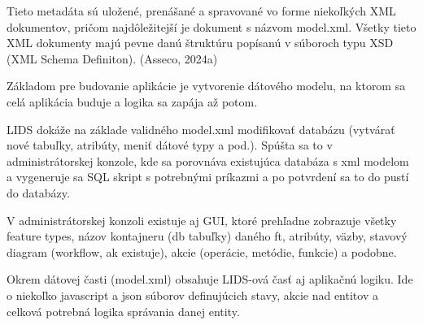 Tieto metadáta sú uložené, prenášané a spravované vo forme niekoľkých XML dokumentov, pričom najdôležitejší je dokument s názvom model.xml. Všetky tieto XML dokumenty majú pevne danú štruktúru popísanú v súboroch typu XSD (XML Schema Definiton). \scr(Asseco, 2024a)

%

Základom pre budovanie aplikácie je vytvorenie dátového modelu, na ktorom sa celá aplikácia buduje a logika sa zapája až potom. 

LIDS dokáže na základe validného model.xml modifikovať databázu (vytvárať nové tabuľky, atribúty, meniť dátové typy a pod.). Spúšta sa to v administrátorskej konzole, kde sa porovnáva existujúca databáza s xml modelom a vygeneruje sa SQL skript s potrebnými príkazmi a po potvrdení sa to do pustí do databázy.

V administrátorskej konzoli existuje aj GUI, ktoré prehľadne zobrazuje všetky feature types, názov kontajneru (db tabuľky) daného ft, atribúty, väzby, stavový diagram (workflow, ak existuje), akcie (operácie, metódie, funkcie) a podobne. 

Okrem dátovej časti (model.xml) obsahuje LIDS-ová časť aj aplikačnú logiku. Ide o niekoľko javascript a json súborov definujúcich stavy, akcie nad entitov a celková potrebná logika správania danej entity.


